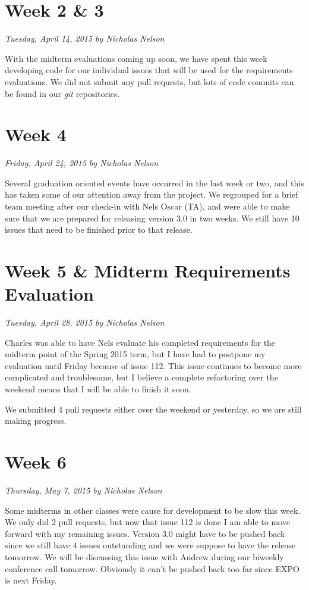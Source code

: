 \documentclass[11pt]{scrreprt}
\begin{document}
\section{Week 2 \& 3}
\textit{Tuesday, April 14, 2015 by Nicholas Nelson}
\newline

With the midterm evaluations coming up soon, we have spent this week developing code for our individual issues that will be used for the requirements evaluations. We did not submit any pull requests, but lots of code commits can be found in our \textit{git} repositories.

\section{Week 4}
\textit{Friday, April 24, 2015 by Nicholas Nelson}
\newline

Several graduation oriented events have occurred in the last week or two, and this has taken some of our attention away from the project. We regrouped for a brief team meeting after our check-in with Nels Oscar (TA), and were able to make sure that we are prepared for releasing version 3.0 in two weeks. We still have 10 issues that need to be finished prior to that release.

\section{Week 5 \& Midterm Requirements Evaluation}
\textit{Tuesday, April 28, 2015 by Nicholas Nelson}
\newline

Charles was able to have Nels evaluate his completed requirements for the midterm point of the Spring 2015 term, but I have had to postpone my evaluation until Friday because of issue 112. This issue continues to become more complicated and troublesome, but I believe a complete refactoring over the weekend means that I will be able to finish it soon.

We submitted 4 pull requests either over the weekend or yesterday, so we are still making progress.

\section{Week 6}
\textit{Thursday, May 7, 2015 by Nicholas Nelson}
\newline

Some midterms in other classes were cause for development to be slow this week. We only did 2 pull requests, but now that issue 112 is done I am able to move forward with my remaining issues. Version 3.0 might have to be pushed back since we still have 4 issues outstanding and we were suppose to have the release tomorrow. We will be discussing this issue with Andrew during our biweekly conference call tomorrow. Obviously it can't be pushed back too far since EXPO is next Friday.
\end{document}
